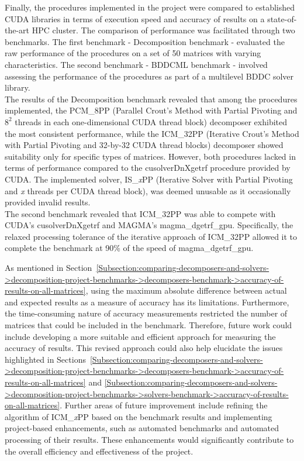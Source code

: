 Finally, the procedures implemented in the project were compared to established CUDA libraries in terms of execution speed and accuracy of results on a state-of-the-art HPC cluster.
The comparison of performance was facilitated through two benchmarks.
The first benchmark - Decomposition benchmark - evaluated the raw performance of the procedures on a set of 50 matrices with varying characteristics.
The second benchmark - BDDCML benchmark - involved assessing the performance of the procedures as part of a multilevel BDDC solver library.\\
The results of the Decomposition benchmark revealed that among the procedures implemented, the PCM\_8PP (Parallel Crout's Method with Partial Pivoting and $8^2$ threads in each one-dimensional CUDA thread block) decomposer exhibited the most consistent performance, while the ICM\_32PP (Iterative Crout's Method with Partial Pivoting and 32-by-32 CUDA thread blocks) decomposer showed suitability only for specific types of matrices.
However, both procedures lacked in terms of performance compared to the cusolverDnXgetrf procedure provided by CUDA.
The implemented solver, IS\_\textit{x}PP (Iterative Solver with Partial Pivoting and \textit{x} threads per CUDA thread block), was deemed unusable as it occasionally provided invalid results.\\
The second benchmark revealed that ICM\_32PP was able to compete with CUDA's cusolverDnXgetrf and MAGMA's magma\_dgetrf\_gpu.
Specifically, the relaxed processing tolerance of the iterative approach of ICM\_32PP allowed it to complete the benchmark at 90\% of the speed of magma\_dgetrf\_gpu.

As mentioned in Section~\ref{Subsection:comparing-decomposers-and-solvers->decomposition-project-benchmarks->decomposers-benchmark->accuracy-of-results-on-all-matrices}, using the maximum absolute difference between actual and expected results as a measure of accuracy has its limitations.
Furthermore, the time-consuming nature of accuracy measurements restricted the number of matrices that could be included in the benchmark.
Therefore, future work could include developing a more suitable and efficient approach for measuring the accuracy of results.
This revised approach could also help elucidate the issues highlighted in Sections~\ref{Subsection:comparing-decomposers-and-solvers->decomposition-project-benchmarks->decomposers-benchmark->accuracy-of-results-on-all-matrices} and \ref{Subsection:comparing-decomposers-and-solvers->decomposition-project-benchmarks->solvers-benchmark->accuracy-of-results-on-all-matrices}.
Further areas of future improvement include refining the algorithm of ICM\_\textit{x}PP based on the benchmark results and implementing project-based enhancements, such as automated benchmarks and automated processing of their results.
These enhancements would significantly contribute to the overall efficiency and effectiveness of the project.